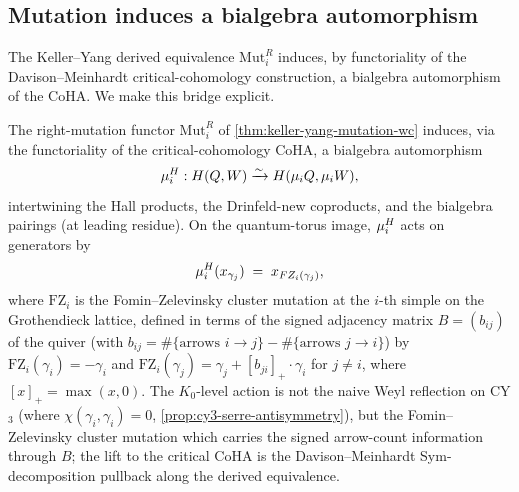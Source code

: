 \subsection{Mutation induces a bialgebra automorphism}
\label{subsec:mutation-bialg-auto}

The Keller--Yang derived equivalence $\mathrm{Mut}_i^R$ induces, by
functoriality of the Davison--Meinhardt critical-cohomology construction,
a bialgebra automorphism of the CoHA. We make this bridge explicit.

\begin{theorem}
  \label{thm:mutation-bialgebra-automorphism}
  \ClaimStatusTheorem
  The right-mutation functor $\mathrm{Mut}_i^R$ of
  \cref{thm:keller-yang-mutation-wc} induces, via the functoriality of the
  critical-cohomology CoHA, a bialgebra automorphism
  \[
    \mu_i^{H} : H(Q, W) \xrightarrow{\sim} H(\mu_i Q, \mu_i W),
  \]
  intertwining the Hall products, the Drinfeld-new coproducts, and the
  bialgebra pairings (at leading residue). On the quantum-torus image,
  $\mu_i^{H}$ acts on generators by
  \[
    \mu_i^{H}(x_{\gamma_j}) \;=\; x_{FZ_i(\gamma_j)},
  \]
  where $\mathrm{FZ}_i$ is the Fomin--Zelevinsky cluster mutation
  \cite[Thm 1.9]{FominZelevinsky2002} at the $i$-th simple on the
  Grothendieck lattice, defined in terms of the signed adjacency matrix
  $B = (b_{ij})$ of the quiver (with $b_{ij} = \#\{\text{arrows } i \to j\} - \#\{\text{arrows } j \to i\}$)
  by $\mathrm{FZ}_i(\gamma_i) = -\gamma_i$ and
  $\mathrm{FZ}_i(\gamma_j) = \gamma_j + [b_{ji}]_+ \cdot \gamma_i$
  for $j \neq i$, where $[x]_+ = \max(x, 0)$. The $K_0$-level action is
  not the naive Weyl reflection on CY$_3$ (where
  $\chi(\gamma_i, \gamma_i) = 0$, \cref{prop:cy3-serre-antisymmetry}),
  but the Fomin--Zelevinsky cluster mutation which
  carries the signed arrow-count information through $B$; the lift to
  the critical CoHA is the Davison--Meinhardt Sym-decomposition pullback
  along the derived equivalence.
\end{theorem}

